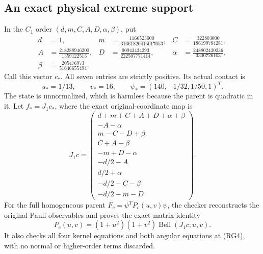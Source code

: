 \subsection{An exact physical extreme support}

In the $C_1$ order $(d,m,C,A,D,\alpha,\beta)$, put
\[
\begin{aligned}
 d&=1,&m&=\frac{1166523000}{31661820415017653},&
 C&=\frac{322803000}{186199784281},\\
 A&=\frac{218288946200}{1359122513},&
 D&=\frac{90943434293}{222507771414},&
 \alpha&=\frac{248802430236}{3300726103},\\
 \beta&=\frac{205476973}{51646655494}.&&
\end{aligned}                                                       \tag{RG3}
\]
Call this vector $c_*$.  All seven entries are strictly positive.
Its actual contact is
\[
 u_*=1/13,\qquad v_*=16,\qquad
 \psi_*=(140,-1/32,1/50,1)^T.                                       \tag{RG4}
\]
The state is unnormalized, which is harmless because the parent is
quadratic in it.  Let $f_*=J_1c_*$, where the exact original-coordinate
map is
\[
 J_1c=
 \begin{pmatrix}
 d+m+C+A+D+\alpha+\beta\\
 -A-\alpha\\m-C-D+\beta\\C+A-\beta\\-m+D-\alpha\\
 -d/2-A\\d/2+\alpha\\-d/2-C-\beta\\-d/2-m-D
 \end{pmatrix}.                                                     \tag{RG5}
\]
For the full homogeneous parent $F_c=\psi^TP_c(u,v)\psi$, the checker
reconstructs the original Pauli observables and proves the exact matrix
identity
\[
 P_c(u,v)=(1+u^2)(1+v^2)\operatorname{Bell}(J_1c;u,v).              \tag{RG6}
\]
It also checks all four kernel equations and both angular equations at
(RG4), with no normal or higher-order terms discarded.

